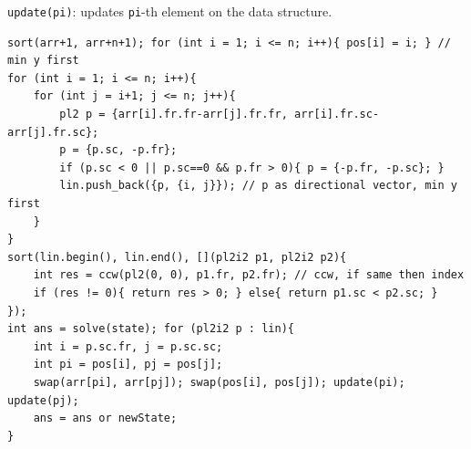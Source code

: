 \texttt{update(pi)}: updates \texttt{pi}-th element on the data structure.
\begin{verbatim}
sort(arr+1, arr+n+1); for (int i = 1; i <= n; i++){ pos[i] = i; } // min y first
for (int i = 1; i <= n; i++){
	for (int j = i+1; j <= n; j++){
		pl2 p = {arr[i].fr.fr-arr[j].fr.fr, arr[i].fr.sc-arr[j].fr.sc};
		p = {p.sc, -p.fr};
		if (p.sc < 0 || p.sc==0 && p.fr > 0){ p = {-p.fr, -p.sc}; }
		lin.push_back({p, {i, j}}); // p as directional vector, min y first
	}
}
sort(lin.begin(), lin.end(), [](pl2i2 p1, pl2i2 p2){
	int res = ccw(pl2(0, 0), p1.fr, p2.fr); // ccw, if same then index
	if (res != 0){ return res > 0; } else{ return p1.sc < p2.sc; }
});
int ans = solve(state); for (pl2i2 p : lin){
	int i = p.sc.fr, j = p.sc.sc;
	int pi = pos[i], pj = pos[j];
	swap(arr[pi], arr[pj]); swap(pos[i], pos[j]); update(pi); update(pj);
	ans = ans or newState;
}
\end{verbatim}